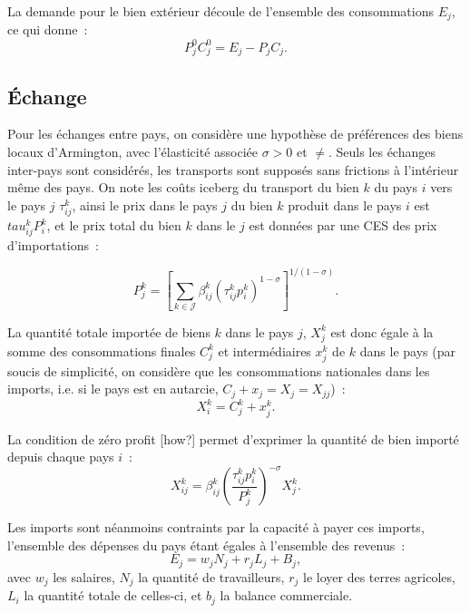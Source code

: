 La demande pour le bien extérieur découle de l’ensemble des consommations $E_j$, ce qui donne~:
\begin{equation}
	P_j^0 C_j^0 = E_j - P_jC_j.
\end{equation}



\subsection{Échange}

Pour les échanges entre pays, on considère une hypothèse de préférences des biens locaux d’Armington, avec l’élasticité associée $\sigma >0$ et $\neq$. Seuls les échanges inter-pays sont considérés, les transports sont supposés sans frictions à l’intérieur même des pays. On note les coûts iceberg du transport du bien $k$ du pays $i$ vers le pays $j$ $\tau_{ij}^k$, ainsi le prix dans le pays $j$ du bien $k$ produit dans le pays $i$ est $tau_{ij}^k P_i^k$, et le prix total du bien $k$ dans le $j$ est données par une CES des prix d’importations~:

\begin{equation}
	P_j^k = \left[ \sum_{k \in \mathcal{J}} \beta_{ij}^k \left(\tau_{ij}^k p_i^k \right)^{1-\sigma} \right]^{1/(1-\sigma)}.
\end{equation}

La quantité totale importée de biens $k$ dans le pays $j$, $X_j^k$ est donc égale à la somme des consommations finales $C_j^k$ et intermédiaires $x_j^k$ de $k$ dans le pays (par soucis de simplicité, on considère que les consommations nationales dans les imports, i.e. si le pays est en autarcie, $C_j + x_j = X_j = X_{jj}$)~:
\begin{equation}
	X_i^k = C_j^k + x_j^k.
\end{equation}

La condition de zéro profit [how?] permet d’exprimer la quantité de bien importé depuis chaque pays $i$~:
\begin{equation}
	X_{ij}^k = \beta_{ij}^k \left( \frac{\tau_{ij}^k p_i^k}{P_j^k}\right)^{- \sigma} X_{j}^k.
\end{equation}

Les imports sont néanmoins contraints par la capacité à payer ces imports, l’ensemble des dépenses du pays étant égales à l’ensemble des revenus~:
\begin{equation}
	E_j = w_j N_j + r_j L_j + B_j,
\end{equation}
avec $w_j$ les salaires, $N_j$ la quantité de travailleurs, $r_j$ le loyer des terres agricoles, $L_i$ la quantité totale de celles-ci, et $b_j$ la balance commerciale.



